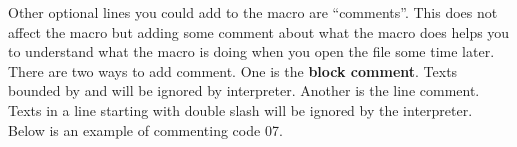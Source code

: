 Other optional lines you could add to the macro are ``comments''. This does not affect the macro but adding some comment about what the macro does helps you to understand what the macro is doing when you open the file some time later. There are two ways to add comment. One is the \textbf{block comment}. Texts bounded by \ilcom{ /*} and \ilcom{*/} will be ignored by interpreter. Another is the line comment. Texts in a line starting with double slash \ilcom{//} will be ignored by the interpreter. Below is an example of commenting code 07. 



